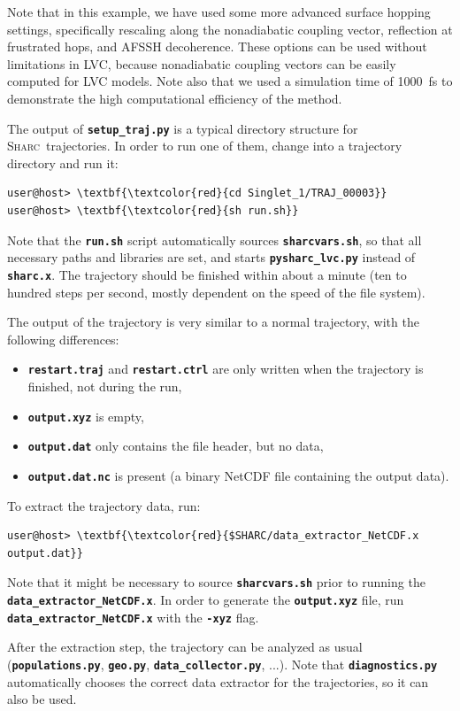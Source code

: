 \documentclass[a4paper,11pt,DIV=15,openany]{scrbook}
\newcommand{\sharc}{\textsc{Sharc}}
\newcommand{\ttt}[1]{\textbf{\texttt{#1}}}
\begin{document}
\normalsize
Note that in this example, we have used some more advanced surface hopping settings, specifically rescaling along the nonadiabatic coupling vector, reflection at frustrated hops, and AFSSH decoherence.
These options can be used without limitations in LVC, because nonadiabatic coupling vectors can be easily computed for LVC models.
Note also that we used a simulation time of 1000~fs to demonstrate the high computational efficiency of the method.

The output of \ttt{setup\_traj.py} is a typical directory structure for \sharc\ trajectories.
In order to run one of them, change into a trajectory directory and run it:
\begin{Verbatim}[commandchars=\\\{\}]
user@host> \textbf{\textcolor{red}{cd Singlet_1/TRAJ_00003}}
user@host> \textbf{\textcolor{red}{sh run.sh}}
\end{Verbatim}
Note that the \ttt{run.sh} script automatically sources \ttt{sharcvars.sh}, so that all necessary paths and libraries are set, and starts \ttt{pysharc\_lvc.py} instead of \ttt{sharc.x}.
The trajectory should be finished within about a minute (ten to hundred steps per second, mostly dependent on the speed of the file system).

The output of the trajectory is very similar to  a normal trajectory, with the following differences:
\begin{itemize}
  \item \ttt{restart.traj} and \ttt{restart.ctrl} are only written when the trajectory is finished, not during the run,
  \item \ttt{output.xyz} is empty,
  \item \ttt{output.dat} only contains the file header, but no data,
  \item \ttt{output.dat.nc} is present (a binary NetCDF file containing the output data).
\end{itemize}
To extract the trajectory data, run:
\begin{Verbatim}[commandchars=\\\{\}]
user@host> \textbf{\textcolor{red}{$SHARC/data_extractor_NetCDF.x output.dat}}
\end{Verbatim}
Note that it might be necessary to source \ttt{sharcvars.sh} prior to running the \ttt{data\_extractor\_NetCDF.x}.
In order to generate the \ttt{output.xyz} file, run \ttt{data\_extractor\_NetCDF.x} with the \ttt{-xyz} flag.

After the extraction step, the trajectory can be analyzed as usual (\ttt{populations.py}, \ttt{geo.py}, \ttt{data\_collector.py}, ...).
Note that \ttt{diagnostics.py} automatically chooses the correct data extractor for the trajectories, so it can also be used.
\end{document}
